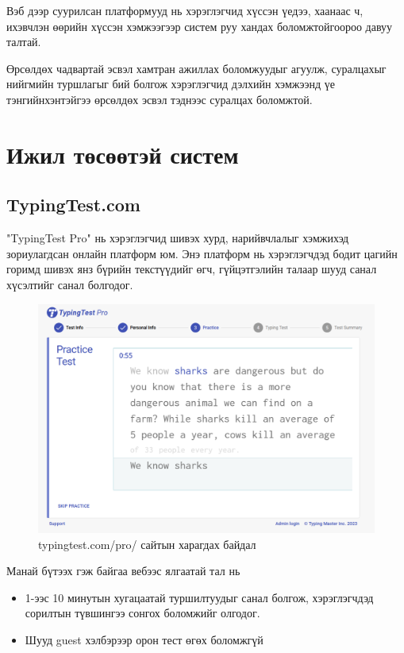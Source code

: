 Вэб дээр суурилсан платформууд нь хэрэглэгчид хүссэн үедээ, хаанаас ч, ихэвчлэн өөрийн хүссэн хэмжээгээр систем руу хандах боломжтойгоороо давуу талтай.

Өрсөлдөх чадвартай эсвэл хамтран ажиллах боломжуудыг агуулж, суралцахыг нийгмийн туршлагыг бий болгож хэрэглэгчид дэлхийн хэмжээнд үе тэнгийнхэнтэйгээ өрсөлдөх эсвэл тэднээс суралцах боломжтой.
\section{Ижил төсөөтэй систем}

\subsection{TypingTest.com}

"TypingTest Pro" нь хэрэглэгчид шивэх хурд, нарийвчлалыг хэмжихэд зориулагдсан онлайн платформ юм. Энэ платформ нь хэрэглэгчдэд бодит цагийн горимд шивэх янз бүрийн текстүүдийг өгч, гүйцэтгэлийн талаар шууд санал хүсэлтийг санал болгодог.

\begin{figure}[h]
	\centering
	\includegraphics[width=15cm]{images/typingtestpro.png}
	\caption{typingtest.com/pro/ сайтын харагдах байдал}
	\label{fig:alltop}
\end{figure}

Манай бүтээх гэж байгаа вебээс ялгаатай тал нь
\begin{itemize}
	\item 1-ээс 10 минутын хугацаатай туршилтуудыг санал болгож, хэрэглэгчдэд сорилтын түвшингээ сонгох боломжийг олгодог.
	\item Шууд guest хэлбэрээр орон тест өгөх боломжгүй
\end{itemize}

